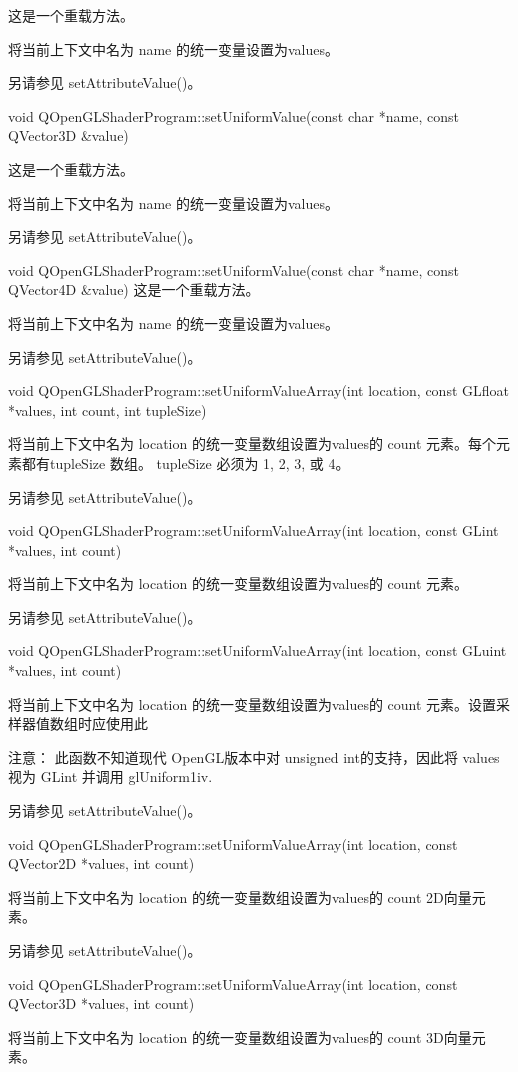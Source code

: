 这是一个重载方法。

将当前上下文中名为 name 的统一变量设置为values。

另请参见 setAttributeValue()。

void QOpenGLShaderProgram::setUniformValue(const char *name, const QVector3D \&value)

这是一个重载方法。

将当前上下文中名为 name 的统一变量设置为values。

另请参见 setAttributeValue()。

void QOpenGLShaderProgram::setUniformValue(const char *name, const QVector4D \&value)
这是一个重载方法。

将当前上下文中名为 name 的统一变量设置为values。

另请参见 setAttributeValue()。

void QOpenGLShaderProgram::setUniformValueArray(int location, const GLfloat *values, int count, int tupleSize)

将当前上下文中名为 location 的统一变量数组设置为values的 count 元素。每个元素都有tupleSize 数组。 tupleSize 必须为 1, 2, 3, 或 4。

另请参见 setAttributeValue()。

void QOpenGLShaderProgram::setUniformValueArray(int location, const GLint *values, int count)

将当前上下文中名为 location 的统一变量数组设置为values的 count 元素。

另请参见 setAttributeValue()。

void QOpenGLShaderProgram::setUniformValueArray(int location, const GLuint *values, int count)

将当前上下文中名为 location 的统一变量数组设置为values的 count 元素。设置采样器值数组时应使用此

注意： 此函数不知道现代 OpenGL版本中对 unsigned int的支持，因此将 values 视为 GLint 并调用 glUniform1iv.

另请参见 setAttributeValue()。

void QOpenGLShaderProgram::setUniformValueArray(int location, const QVector2D *values, int count)

将当前上下文中名为 location 的统一变量数组设置为values的 count 2D向量元素。

另请参见 setAttributeValue()。

void QOpenGLShaderProgram::setUniformValueArray(int location, const QVector3D *values, int count)

将当前上下文中名为 location 的统一变量数组设置为values的 count 3D向量元素。

